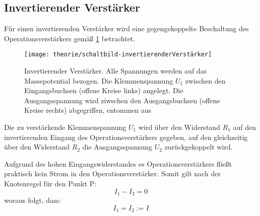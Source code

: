 \subsection{Invertierender Verstärker}
Für einen invertierenden Verstärker wird eine gegengekoppelte Beschaltung des
Operationsverstärkers gemäß \cref{fig:Theorie/invertierenderVerstärker} 
betrachtet.

\begin{figure}[H]
	\centering
	\texttt{[image: theorie/schaltbild-invertierenderVerstärker]}
	\caption{Invertierender Verstärker. Alle Spannungen werden auf das 
	Massepotential bezogen. Die Klemmenspannung $U_1$ zwischen den 
	Eingangsbuchsen (offene Kreise links) angelegt. Die Ausgangsspannung wird
	ziwschen den Ausgangsbuchsen (offene Kreise rechts) abgegriffen, entommen
	aus \cite{script}}
	\label{fig:Theorie/invertierenderVerstärker}
\end{figure}

Die zu verstärkende Klemmenspannung $U_1$ wird über den Widerstand $R_1$ auf den
invertierenden Eingang des Operationsverstärkers gegeben, auf den gleichzeitig
über den Widerstand $R_2$ die Ausgangsspannung $U_2$ zurückgekoppelt wird.

Aufgrund des hohen Eingangswiderstandes es Operationsverstärkers fließt
praktisch kein Strom in den Operationsverstärker. Somit gilt nach der 
Knotenregel für den Punkt P:
\begin{equation}
	I_1 - I_2 = 0
\end{equation}
woraus folgt, dass:
\begin{equation}\label{eq:Stromstärkengleichgewicht}
	I_1 = I_2 := I
\end{equation}

